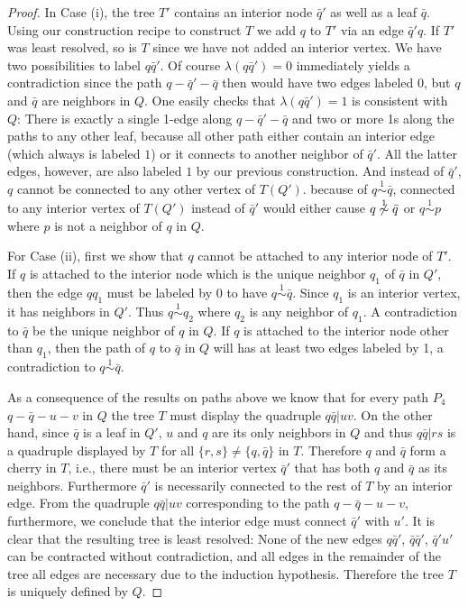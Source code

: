 \documentclass[smallextended]{svjour3}
\newcommand{\Rl}{\mathrel{\overset{1}{\sim}}}
\begin{document}
{\begin{proof}
  In Case (i), the tree $T'$ contains an interior node $\bar q'$ as well as
  a leaf $\bar q$.  Using our construction recipe to construct $T$ we add
  $q$ to $T'$ via an edge $\bar q' q$. If $T'$ was least resolved, so is
  $T$ since we have not added an interior vertex.  We have two
  possibilities to label $q\bar q'$.  Of course $\lambda(q\bar q')=0$
  immediately yields a contradiction since the path $q-\bar q'-\bar q$ then
  would have two edges labeled $0$, but $q$ and $\bar q$ are neighbors in
  $Q$. One easily checks that $\lambda(q\bar q')=1$ is consistent with $Q$:
  There is exactly a single 1-edge along $q-\bar q'-\bar q$ and two or more
  1s along the paths to any other leaf, because all other path either
  contain an interior edge (which always is labeled $1$) or it connects to
  another neighbor of $\bar q'$. All the latter edges, however, are also
  labeled $1$ by our previous construction.  And instead of $\bar q'$, $q$
  cannot be connected to any other vertex of $T(Q')$.  because of $q\Rl
  \bar q$, connected to any interior vertex of $T(Q')$ instead of $\bar q'$
  would either cause $q\not \Rl \bar q$ or $q\Rl p$ where $p$ is not a
  neighbor of $q$ in $Q$.
 
  For Case (ii), first we show that $q$ cannot be attached to any interior
  node of $T'$. If $q$ is attached to the interior node which is the unique
  neighbor $q_1$ of $\bar q$ in $Q'$, then the edge $qq_1$ must be labeled
  by 0 to have $q\Rl \bar q$. Since $q_1$ is an interior vertex, it has
  neighbors in $Q'$. Thus $q\Rl q_2$ where $q_2$ is any neighbor of
  $q_1$. A contradiction to $\bar q$ be the unique neighbor of $q$ in
  $Q$. If $q$ is attached to the interior node other than $q_1$, then the
  path of $q$ to $\bar q$ in $Q$ will has at least two edges labeled by 1,
  a contradiction to $q \Rl \bar q$.
  
  As a consequence of the results on paths above we know that for every
  path $P_4$ $q-\bar q-u-v$ in $Q$ the tree $T$ must display the quadruple
  $q\bar q|uv$. On the other hand, since $\bar q$ is a leaf in $Q'$, $u$
  and $q$ are its only neighbors in $Q$ and thus $q\bar q|rs$ is a
  quadruple displayed by $T$ for all $\{r,s\}\ne\{q,\bar q\}$ in
  $T$. Therefore $q$ and $\bar q$ form a cherry in $T$, i.e., there must be
  an interior vertex $\bar q'$ that has both $q$ and $\bar q$ as its
  neighbors. Furthermore $\bar q'$ is necessarily connected to the rest of
  $T$ by an interior edge. From the quadruple $q\bar q|uv$ corresponding to
  the path $q-\bar q-u-v$, furthermore, we conclude that the interior edge
  must connect $\bar q'$ with $u'$. It is clear that the resulting tree is
  least resolved: None of the new edges $q\bar q'$, $\bar q\bar q'$, $\bar
  q'u'$ can be contracted without contradiction, and all edges in the
  remainder of the tree all edges are necessary due to the induction
  hypothesis. Therefore the tree $T$ is uniquely defined by $Q$.


\end{proof}}
\end{document}
